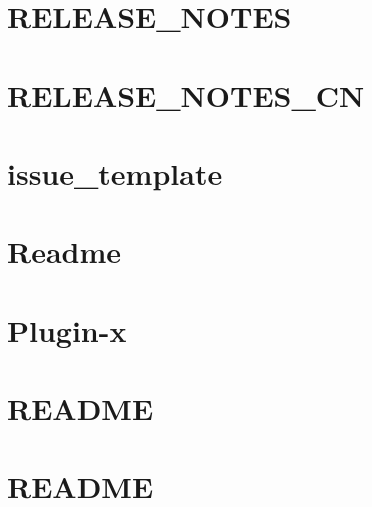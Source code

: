 \documentclass[twoside]{book}
\newcommand{\+}{\discretionary{\mbox{\scriptsize$\hookleftarrow$}}{}{}}
\begin{document}
\chapter{R\+E\+L\+E\+A\+S\+E\+\_\+\+N\+O\+T\+ES}
\label{md__home_pmx_git_PMX_SimuCocos_cocos2d_docs_RELEASE_NOTES}

\chapter{R\+E\+L\+E\+A\+S\+E\+\_\+\+N\+O\+T\+E\+S\+\_\+\+CN}
\label{md__home_pmx_git_PMX_SimuCocos_cocos2d_docs_RELEASE_NOTES_CN}

\chapter{issue\+\_\+template}
\label{md__home_pmx_git_PMX_SimuCocos_cocos2d_issue_template}

\chapter{Readme}
\label{md__home_pmx_git_PMX_SimuCocos_cocos2d_plugin_plugins_googleplay_Readme}

\chapter{Plugin-\/x}
\label{md__home_pmx_git_PMX_SimuCocos_cocos2d_plugin_README}

\chapter{R\+E\+A\+D\+ME}
\label{md__home_pmx_git_PMX_SimuCocos_cocos2d_README}

\chapter{R\+E\+A\+D\+ME}
\label{md__home_pmx_git_PMX_SimuCocos_cocos2d_tools_fbx-conv_README}

\end{document}
